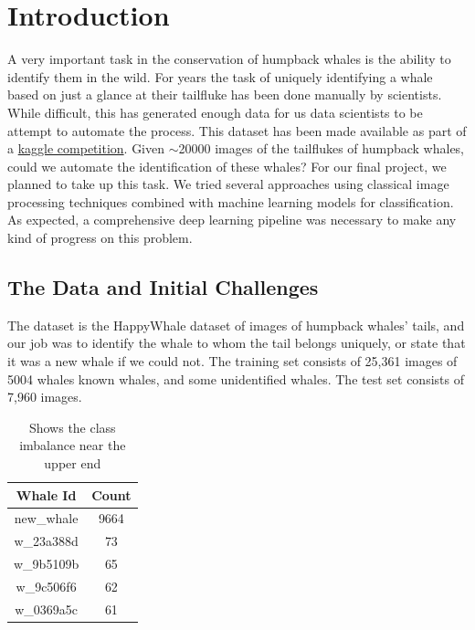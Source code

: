 \section{Introduction}
A very important task in the conservation of humpback whales is the ability to identify them in the wild. For years the task of uniquely identifying a whale based on just a glance at their tailfluke has been done manually by scientists. While difficult, this has generated enough data for us data scientists to be attempt to automate the process. This dataset has been made available as part of a \href{https://www.kaggle.com/c/humpback-whale-identification}{kaggle competition}. Given $\sim$20000 images of the tailflukes of humpback whales, could we automate the identification of these whales? For our final project, we planned to take up this task. We tried several approaches using classical image processing techniques combined with machine learning models for classification. As expected, a comprehensive deep learning pipeline was necessary to make any kind of progress on this problem.

\subsection{The Data and Initial Challenges}\label{subs:datachallenges}

The dataset is the HappyWhale dataset of images of humpback whales' tails, and our job was to identify the whale to whom the tail belongs uniquely, or state that it was a new whale if we could not. The training set consists of 25,361 images of 5004 whales known whales, and some unidentified whales. The test set consists of 7,960 images.\\

\begin{table}[h!]
	\centering
	\begin{tabular}{|c|c|}\hline
		\textbf{Whale Id} & \textbf{Count}\\ \hline
		new\_whale  & 9664\\ \hline
		w\_23a388d  & 73\\ \hline
		w\_9b5109b  & 65\\ \hline
		w\_9c506f6  & 62\\ \hline
		w\_0369a5c  & 61\\ \hline
	\end{tabular}
	\caption{\label{tab:counts}Shows the class imbalance near the upper end}
\end{table}

